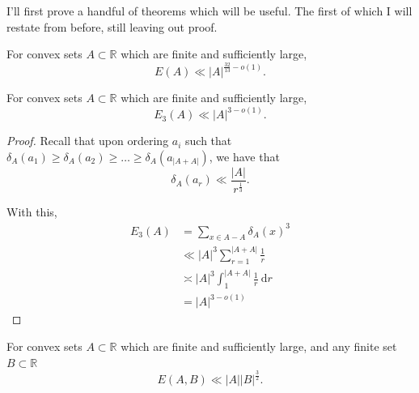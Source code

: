 \documentclass[12pt]{amsart}
\begin{document}
I'll first prove a handful of theorems which will be useful. The first of which
I will restate from before, still leaving out proof.

\begin{theorem}
For convex sets \(A \subset \mathbb{R} \) which are finite and sufficiently large,
\[
    E(A) \ll \left\lvert A \right\rvert ^{\frac{32}{13} - o(1)}
.\]
\end{theorem}

\begin{theorem}
For convex sets \(A \subset \mathbb{R} \) which are finite and sufficiently large,
\[
    E_{3} (A) \ll \left\lvert A \right\rvert ^{ 3 - o(1)}
.\]
\end{theorem}

\begin{proof}
Recall that upon ordering \(a_{i} \) such that \(\delta_A(a_1) \geq \delta_A(a_2) \geq \dots \geq \delta_{A} (a_{\left\lvert A+A \right\rvert } )\),
we have that
\[
    \delta_{A} (a_{r} ) \ll \frac{\left\lvert A \right\rvert }{r^{\frac{1}{3} }}
.\]

With this,
\begin{align*}
E_3(A) & = \sum _{x \in A-A} \delta_{A} (x)^{3} \\
& \ll \left\lvert A \right\rvert ^{3} \sum_{r=1}^{\left\lvert A+A \right\rvert } \frac{1}{r}\\
& \asymp \left\lvert A \right\rvert ^{3} \int_{1}^{\left\lvert A+A \right\rvert } \frac{1}{r}  ~\mathrm{d} r \\
& = \left\lvert A \right\rvert ^{3 - o(1)}
\end{align*}
\end{proof}

\begin{theorem}
For convex sets \(A \subset \mathbb{R} \) which are finite and sufficiently large, and any finite set \(B \subset \mathbb{R} \)
\[
    E(A,B) \ll \left\lvert A \right\rvert \left\lvert B \right\rvert ^{\frac{3}{2} }
.\]
\end{theorem}
\end{document}
